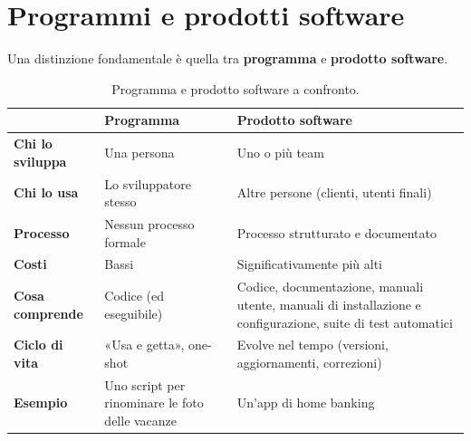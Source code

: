 \section{Programmi e prodotti software}

Una distinzione fondamentale è quella tra \textbf{programma} e \textbf{prodotto software}.



\begin{table}[H]
\centering
\renewcommand{\arraystretch}{1.35}
\begin{tabularx}{\textwidth}{>{\bfseries}P{3.3cm} L L}
\toprule
 & \textcolor{swteal}{Programma} & \textcolor{swblue}{Prodotto software} \\
\midrule
Chi lo sviluppa & Una persona & Uno o più team \\
Chi lo usa & Lo sviluppatore stesso & Altre persone (clienti, utenti finali) \\
Processo & Nessun processo formale & Processo strutturato e documentato \\
Costi & Bassi & Significativamente più alti \\
Cosa comprende & Codice (ed eseguibile) & Codice, documentazione, manuali utente, manuali di installazione e configurazione, suite di test automatici \\
Ciclo di vita & «Usa e getta», one-shot & Evolve nel tempo (versioni, aggiornamenti, correzioni) \\
Esempio & Uno script per rinominare le foto delle vacanze & Un'app di home banking \\
\bottomrule
\end{tabularx}
\caption{Programma e prodotto software a confronto.}
\end{table}

